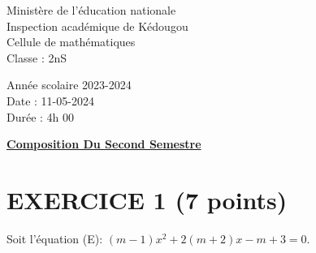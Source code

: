 \documentclass{article}
\begin{document}
\begin{minipage}{0.5\textwidth}
	Ministère de l'éducation nationale  \\
	Inspection académique de Kédougou   \\
	Cellule de mathématiques            \\
	Classe : 2nS  \\
\end{minipage}
\begin{minipage}{0.5\textwidth}
	Année scolaire 2023-2024 \\
	Date : 11-05-2024 \\
	Durée : 4h 00 \\
\end{minipage}

\begin{center}
	\textbf{{\underline{Composition Du Second Semestre}}}
\end{center}
\section*{EXERCICE 1 (7 points)}   
Soit l’équation (E): \((m -1)x^2 + 2(m + 2)x - m + 3 = 0\).
\end{document}
